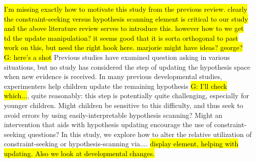 \documentclass[10pt,letterpaper]{article}
\begin{document}

%

\hl{I'm missing exactly how to motivate this study from the previous review.
clearly the constraint-seeking versus hypothesis scanning element is critical
to our study and the above literature review serves to introduce this. however
how to we get td the update manipulation?  it seems good that it is sorta
orthogonal to past work on this, but need the right hook here.  marjorie
might have ideas?  george? G: here's a shot}
Previous studies have examined question asking in various situations, but no study has considered the 
step of updating the hypothesis space when new evidence is received. In many previous developmental studies, experimenters help children update the remaining hypothesis \hl{G: I'll check which...}, quite reasonably: this step 
is potentially quite challenging, especially for younger children. Might children be sensitive to this difficulty, and thus seek to avoid errors by using easily-interpretable hypothesis scanning? Might an intervention that aids with hypothesis updating encourage the use of constraint-seeking questions? 
In this study, we explore how to alter the relative utilization of constraint-seeking
or hypothesis-scanning via.... \hl{display element, helping with updating.  Also
we look at developmental changes.}
\end{document}

